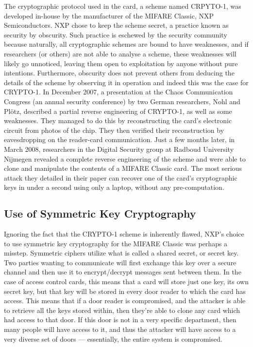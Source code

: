 \documentclass[12pt,a4paper,twoside,openright]{report}
\begin{document}
The cryptographic protocol used in the card, a scheme named CRPYTO-1, was developed in-house by the manufacturer of the MIFARE Classic, NXP Semiconductors. NXP chose to keep the scheme secret, a practice known as security by obscurity. Such practice is eschewed by the security community because naturally, all cryptographic schemes are bound to have weaknesses, and if researchers (or others) are not able to analyse a scheme, these weaknesses will likely go unnoticed, leaving them open to exploitation by anyone without pure intentions. Furthermore, obscurity does not prevent others from deducing the details of the scheme by observing it in operation and indeed this was the case for CRYPTO-1. In December 2007, a presentation at the Chaos Communication Congress (an annual security conference) by two German researchers, Nohl and Pl{\"o}tz, described a partial reverse engineering of CRYPTO-1, as well as some weaknesses. They managed to do this by reconstructing the card's electronic circuit from photos of the chip. They then verified their reconstruction by eavesdropping on the reader-card communication. Just a few months later, in March 2008, researchers in the Digital Security group at Radboud University Nijmegen revealed a complete reverse engineering of the scheme and were able to clone and manipulate the contents of a MIFARE Classic card. The most serious attack they detailed in their paper can recover one of the card's cryptographic keys in under a second using only a laptop, without any pre-computation.

\subsection{Use of Symmetric Key Cryptography}

Ignoring the fact that the CRYPTO-1 scheme is inherently flawed, NXP's choice to use symmetric key cryptography for the MIFARE Classic was perhaps a misstep. Symmetric ciphers utilize what is called a shared secret, or secret key. Two parties wanting to communicate will first exchange this key over a secure channel and then use it to encrypt/decrypt messages sent between them. In the case of access control cards, this means that a card will store just one key, its own secret key, but that key will be stored in every door reader to which the card has access. This means that if a door reader is compromised, and the attacker is able to retrieve all the keys stored within, then they're able to clone any card which had access to that door. If this door is not in a very specific department, then many people will have access to it, and thus the attacker will have access to a very diverse set of doors --- essentially, the entire system is compromised.
\end{document}
